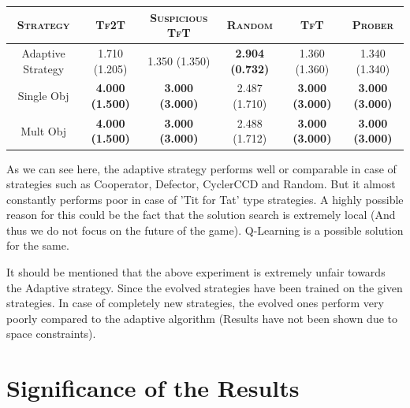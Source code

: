 \documentclass[a4paper]{article}
\begin{document}
	\vspace{-8mm}	
	\renewcommand{\tabcolsep}{6pt}

	\begin{table}[H]
	  \begin{center}
	  	\footnotesize
	    \begin{tabular}{|c|c|c|c|c|c|}
	      \toprule
	 	  \textsc{Strategy} & \textsc{Tf2T} & {\footnotesize{\textsc{Suspicious TfT}}} & \textsc{Random} & \textsc{TfT} & \textsc{Prober}\\
		  \midrule
		  Adaptive Strategy & 1.710 {(1.205)} & 1.350 (1.350) & \textbf{2.904 (0.732)} & 1.360 (1.360) & 1.340 (1.340)\\
		  Single Obj & \textbf{4.000} \textbf{(1.500)} & \textbf{3.000 (3.000)} & 2.487 (1.710) & \textbf{3.000 (3.000)} & \textbf{3.000 (3.000)}\\
		  Mult Obj & \textbf{4.000} \textbf{(1.500)} & \textbf{3.000 (3.000)} & 2.488 (1.712) & \textbf{3.000 (3.000)} & \textbf{3.000 (3.000)}\\
		  \bottomrule
	    \end{tabular}
	  \end{center}
	\end{table}  		
	\vspace{-3mm}	

	As we can see here, the adaptive strategy performs well or comparable in case of strategies such as Cooperator, Defector, CyclerCCD and Random. But it almost constantly performs poor in case of 'Tit for Tat' type strategies. A highly possible reason for this could be the fact that the solution search is extremely local (And thus we do not focus on the future of the game). Q-Learning is a possible solution for the same.

	It should be mentioned that the above experiment is extremely unfair towards the Adaptive strategy. Since the evolved strategies have been trained on the given strategies. In case of completely new strategies, the evolved ones perform very poorly compared to the adaptive algorithm (Results have not been shown due to space constraints).

	\section{Significance of the Results}
	
\end{document}
